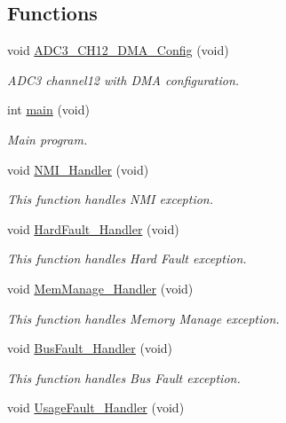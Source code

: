 \subsection*{Functions}
\begin{DoxyCompactItemize}
\item 
void \hyperlink{group___a_d_c___a_d_c3___d_m_a_ga30ffb0dd8db97c6e74fe77ff6afe2111}{A\-D\-C3\-\_\-\-C\-H12\-\_\-\-D\-M\-A\-\_\-\-Config} (void)
\begin{DoxyCompactList}\small\item\em A\-D\-C3 channel12 with D\-M\-A configuration. \end{DoxyCompactList}\item 
int \hyperlink{group___a_d_c___a_d_c3___d_m_a_ga840291bc02cba5474a4cb46a9b9566fe}{main} (void)
\begin{DoxyCompactList}\small\item\em Main program. \end{DoxyCompactList}\item 
void \hyperlink{group___a_d_c___a_d_c3___d_m_a_ga6ad7a5e3ee69cb6db6a6b9111ba898bc}{N\-M\-I\-\_\-\-Handler} (void)
\begin{DoxyCompactList}\small\item\em This function handles N\-M\-I exception. \end{DoxyCompactList}\item 
void \hyperlink{group___a_d_c___a_d_c3___d_m_a_ga2bffc10d5bd4106753b7c30e86903bea}{Hard\-Fault\-\_\-\-Handler} (void)
\begin{DoxyCompactList}\small\item\em This function handles Hard Fault exception. \end{DoxyCompactList}\item 
void \hyperlink{group___a_d_c___a_d_c3___d_m_a_ga3150f74512510287a942624aa9b44cc5}{Mem\-Manage\-\_\-\-Handler} (void)
\begin{DoxyCompactList}\small\item\em This function handles Memory Manage exception. \end{DoxyCompactList}\item 
void \hyperlink{group___a_d_c___a_d_c3___d_m_a_ga850cefb17a977292ae5eb4cafa9976c3}{Bus\-Fault\-\_\-\-Handler} (void)
\begin{DoxyCompactList}\small\item\em This function handles Bus Fault exception. \end{DoxyCompactList}\item 
void \hyperlink{group___a_d_c___a_d_c3___d_m_a_ga1d98923de2ed6b7309b66f9ba2971647}{Usage\-Fault\-\_\-\-Handler} (void)

\end{DoxyCompactItemize}
